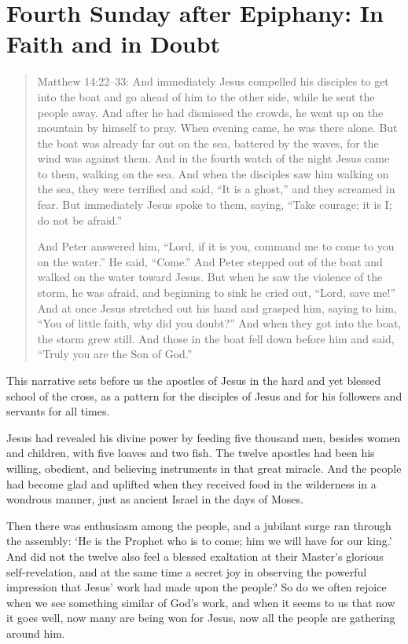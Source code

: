 
\section{Fourth Sunday after Epiphany: In Faith and in Doubt}

\begin{quote}

Matthew 14:22–33: And immediately Jesus compelled his disciples to get into the boat and go ahead of him to the other side, while he sent the people away. And after he had dismissed the crowds, he went up on the mountain by himself to pray. When evening came, he was there alone. But the boat was already far out on the sea, battered by the waves, for the wind was against them. And in the fourth watch of the night Jesus came to them, walking on the sea. And when the disciples saw him walking on the sea, they were terrified and said, “It is a ghost,” and they screamed in fear. But immediately Jesus spoke to them, saying, “Take courage; it is I; do not be afraid.”

And Peter answered him, “Lord, if it is you, command me to come to you on the water.” He said, “Come.” And Peter stepped out of the boat and walked on the water toward Jesus. But when he saw the violence of the storm, he was afraid, and beginning to sink he cried out, “Lord, save me!” And at once Jesus stretched out his hand and grasped him, saying to him, “You of little faith, why did you doubt?” And when they got into the boat, the storm grew still. And those in the boat fell down before him and said, “Truly you are the Son of God.”

\end{quote}

\bigskip


This narrative sets before us the apostles of Jesus in the hard and yet blessed school of the cross, as a pattern for the disciples of Jesus and for his followers and servants for all times.

Jesus had revealed his divine power by feeding five thousand men, besides women and children, with five loaves and two fish. The twelve apostles had been his willing, obedient, and believing instruments in that great miracle. And the people had become glad and uplifted when they received food in the wilderness in a wondrous manner, just as ancient Israel in the days of Moses.

Then there was enthusiasm among the people, and a jubilant surge ran through the assembly: ‘He is the Prophet who is to come; him we will have for our king.’ And did not the twelve also feel a blessed exaltation at their Master’s glorious self-revelation, and at the same time a secret joy in observing the powerful impression that Jesus’ work had made upon the people? So do we often rejoice when we see something similar of God’s work, and when it seems to us that now it goes well, now many are being won for Jesus, now all the people are gathering around him.

